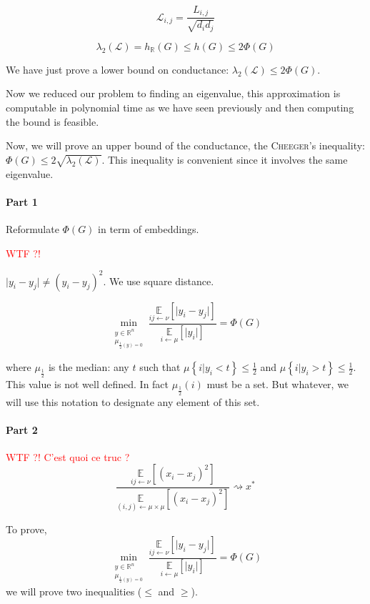 \documentclass[12pt]{article}
\newcommand{\EE}{\mathbb{E}}
\newcommand{\RR}{\mathbb{R}}
\renewcommand{\L}{\mathcal{L}}
\newcommand{\set}[1]{\left\{ #1 \right\}}
\newcommand{\wtf}[1]{\Huge\textcolor{red}{WTF ?! #1}\normalsize}
\newcommand{\la}{\leftarrow}
\newcommand{\esp}[2][]{\underset{#1}{\EE}\left[ #2 \right]}
\begin{document}
\[
    \boxed{\L_{i,j} = \frac{L_{i,j}}{\sqrt{d_id_j}}}
\]

\[
    \lambda_2(\L) = h_\RR(G) \leqslant h(G) \leqslant 2\Phi(G)
\]

We have just prove a lower bound on conductance: $\lambda_2(\L) \leqslant 2\Phi(G)$. 

Now we reduced our problem to finding an eigenvalue, this approximation is computable in polynomial time as we have seen previously and then computing the bound is feasible.

Now, we will prove an upper bound of the conductance, the \textsc{Cheeger}'s inequality: $\Phi(G) \leqslant 2\sqrt{\lambda_2(\L)}$. This inequality is convenient since it involves the same eigenvalue.

\paragraph{Part 1}

Reformulate $\Phi(G)$ in term of embeddings.

\wtf{}

$\lvert y_i -y_j \rvert \neq (y_i-y_j)^2$. We use square distance.

\[
    \min\limits_{\substack{y\in\RR^n\\\mu_{\frac{1}{2}(y)=0}}} \frac{\esp[ij\la\nu]{\lvert y_i-y_j\rvert}}{\esp[i\la\mu]{\lvert y_i \rvert}} = \Phi(G)
\]

where $\mu_{\frac{1}{2}}$ is the median: any $t$ such that $\mu\set{i\vert y_i < t} \leqslant \frac{1}{2}$ and $\mu\set{i\vert y_i >t} \leqslant \frac{1}{2}$. This value is not well defined. In fact $\mu_{\frac{1}{2}}(i)$ must be a set. But whatever, we will use this notation to designate any element of this set.


\paragraph{Part 2}
\wtf{C'est quoi ce truc ?}
\[
    \frac{\esp[ij\la\nu]{(x_i-x_j)^2}}{\esp[(i,j)\la\mu\times\mu]{(x_i-x_j)^2}} \rightsquigarrow x^*
\]



To prove,
\[
    \min\limits_{\substack{y\in\RR^n\\\mu_{\frac{1}{2}(y)=0}}} \frac{\esp[ij\la\nu]{\lvert y_i-y_j\rvert}}{\esp[i\la\mu]{\lvert y_i \rvert}} = \Phi(G)
\]
we will prove two inequalities ($\leqslant$ and $\geqslant$).
\end{document}
